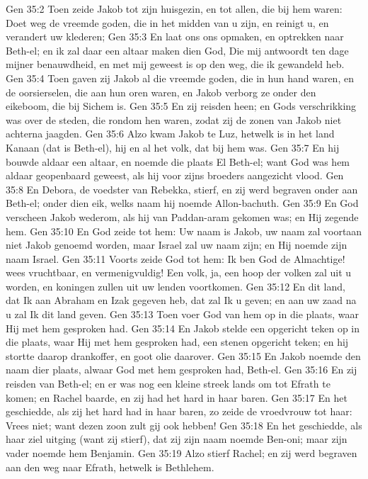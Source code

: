 Gen 35:2  Toen zeide Jakob tot zijn huisgezin, en tot allen, die bij hem waren: Doet weg de vreemde goden, die in het midden van u zijn, en reinigt u, en verandert uw klederen;
Gen 35:3  En laat ons ons opmaken, en optrekken naar Beth-el; en ik zal daar een altaar maken dien God, Die mij antwoordt ten dage mijner benauwdheid, en met mij geweest is op den weg, die ik gewandeld heb.
Gen 35:4  Toen gaven zij Jakob al die vreemde goden, die in hun hand waren, en de oorsierselen, die aan hun oren waren, en Jakob verborg ze onder den eikeboom, die bij Sichem is.
Gen 35:5  En zij reisden heen; en Gods verschrikking was over de steden, die rondom hen waren, zodat zij de zonen van Jakob niet achterna jaagden.
Gen 35:6  Alzo kwam Jakob te Luz, hetwelk is in het land Kanaan (dat is Beth-el), hij en al het volk, dat bij hem was.
Gen 35:7  En hij bouwde aldaar een altaar, en noemde die plaats El Beth-el; want God was hem aldaar geopenbaard geweest, als hij voor zijns broeders aangezicht vlood.
Gen 35:8  En Debora, de voedster van Rebekka, stierf, en zij werd begraven onder aan Beth-el; onder dien eik, welks naam hij noemde Allon-bachuth.
Gen 35:9  En God verscheen Jakob wederom, als hij van Paddan-aram gekomen was; en Hij zegende hem.
Gen 35:10  En God zeide tot hem: Uw naam is Jakob, uw naam zal voortaan niet Jakob genoemd worden, maar Israel zal uw naam zijn; en Hij noemde zijn naam Israel.
Gen 35:11  Voorts zeide God tot hem: Ik ben God de Almachtige! wees vruchtbaar, en vermenigvuldig! Een volk, ja, een hoop der volken zal uit u worden, en koningen zullen uit uw lenden voortkomen.
Gen 35:12  En dit land, dat Ik aan Abraham en Izak gegeven heb, dat zal Ik u geven; en aan uw zaad na u zal Ik dit land geven.
Gen 35:13  Toen voer God van hem op in die plaats, waar Hij met hem gesproken had.
Gen 35:14  En Jakob stelde een opgericht teken op in die plaats, waar Hij met hem gesproken had, een stenen opgericht teken; en hij stortte daarop drankoffer, en goot olie daarover.
Gen 35:15  En Jakob noemde den naam dier plaats, alwaar God met hem gesproken had, Beth-el.
Gen 35:16  En zij reisden van Beth-el; en er was nog een kleine streek lands om tot Efrath te komen; en Rachel baarde, en zij had het hard in haar baren.
Gen 35:17  En het geschiedde, als zij het hard had in haar baren, zo zeide de vroedvrouw tot haar: Vrees niet; want dezen zoon zult gij ook hebben!
Gen 35:18  En het geschiedde, als haar ziel uitging (want zij stierf), dat zij zijn naam noemde Ben-oni; maar zijn vader noemde hem Benjamin.
Gen 35:19  Alzo stierf Rachel; en zij werd begraven aan den weg naar Efrath, hetwelk is Bethlehem.
